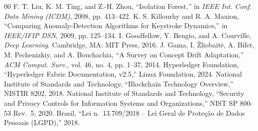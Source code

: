 \documentclass[conference]{IEEEtran}
\begin{document}
\begin{thebibliography}{00}
 F. T. Liu, K. M. Ting, and Z.-H. Zhou, ``Isolation Forest,'' in \emph{IEEE Int. Conf. Data Mining (ICDM)}, 2008, pp. 413--422.
 K. S. Killourhy and R. A. Maxion, ``Comparing Anomaly-Detection Algorithms for Keystroke Dynamics,'' in \emph{IEEE/IFIP DSN}, 2009, pp. 125--134.
 I. Goodfellow, Y. Bengio, and A. Courville, \emph{Deep Learning}. Cambridge, MA: MIT Press, 2016.
 J. Gama, I. \v{Z}liobait\.e, A. Bifet, M. Pechenizkiy, and A. Bouchachia, ``A Survey on Concept Drift Adaptation,'' \emph{ACM Comput. Surv.}, vol. 46, no. 4, pp. 1--37, 2014.
 Hyperledger Foundation, ``Hyperledger Fabric Documentation, v2.5,'' Linux Foundation, 2024.
 National Institute of Standards and Technology, ``Blockchain Technology Overview,'' NISTIR 8202, 2018.
 National Institute of Standards and Technology, ``Security and Privacy Controls for Information Systems and Organizations,'' NIST SP 800-53 Rev.\ 5, 2020.
 Brasil, ``Lei n.\ 13.709/2018 -- Lei Geral de Proteção de Dados Pessoais (LGPD),'' 2018.
\end{thebibliography}
\end{document}
